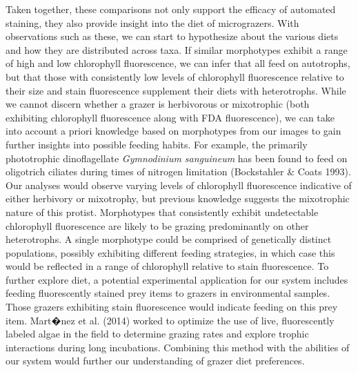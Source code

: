 Taken together, these comparisons not only support the efficacy of automated staining, they also provide insight into the diet of micrograzers. With observations such as these, we can start to hypothesize about the various diets and how they are distributed across taxa. If similar morphotypes exhibit a range of high and low chlorophyll fluorescence, we can infer that all feed on autotrophs, but that those with consistently low levels of chlorophyll fluorescence relative to their size and stain fluorescence supplement their diets with heterotrophs. While we cannot discern whether a grazer is herbivorous or mixotrophic (both exhibiting chlorophyll fluorescence along with FDA fluorescence), we can take into account a priori knowledge based on morphotypes from our images to gain further insights into possible feeding habits. For example, the primarily phototrophic dinoflagellate \textit{Gymnodinium sanguineum} has been found to feed on oligotrich ciliates during times of nitrogen limitation (Bockstahler \& Coats 1993). Our analyses would observe varying levels of chlorophyll fluorescence indicative of either herbivory or mixotrophy, but previous knowledge suggests the mixotrophic nature of this protist. Morphotypes that consistently exhibit undetectable chlorophyll fluorescence are likely to be grazing predominantly on other heterotrophs. A single morphotype could be comprised of genetically distinct populations, possibly exhibiting different feeding strategies, in which case this would be reflected in a range of chlorophyll relative to stain
fluorescence. To further explore diet, a potential experimental application for our system includes feeding fluorescently stained prey items to grazers in environmental samples. Those grazers exhibiting stain fluorescence would indicate feeding on this prey item. Mart�nez et al. (2014) worked to optimize the use of live, fluorescently labeled algae in the field to determine grazing rates and explore trophic interactions during long incubations. Combining this method with the abilities of our system would further our understanding of grazer diet preferences.

